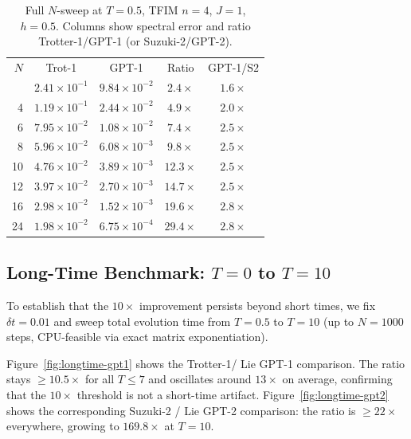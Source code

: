 \documentclass[aps,prxquantum,twocolumn,nofootinbib]{revtex4-2}
\begin{document}
\begin{table}[t]
  \caption{Full $N$-sweep at $T=0.5$, TFIM $n=4$, $J=1$, $h=0.5$.
    Columns show spectral error and ratio Trotter-1/GPT-1
    (or Suzuki-2/GPT-2).}
  \label{tab:nsweep}
  \begin{ruledtabular}
    \small
    \begin{tabular}{rcccc}
      $N$ & Trot-1 & GPT-1 & Ratio & GPT-1/$\text{S2}$ \\
      \colrule
      2  & $2.41\times10^{-1}$ & $9.84\times10^{-2}$ & $2.4\times$ & $1.6\times$ \\
      4  & $1.19\times10^{-1}$ & $2.44\times10^{-2}$ & $4.9\times$ & $2.0\times$ \\
      6  & $7.95\times10^{-2}$ & $1.08\times10^{-2}$ & $7.4\times$ & $2.5\times$ \\
      8  & $5.96\times10^{-2}$ & $6.08\times10^{-3}$ & $9.8\times$ & $2.5\times$ \\
      10 & $4.76\times10^{-2}$ & $3.89\times10^{-3}$ & $12.3\times$ & $2.5\times$\\
      12 & $3.97\times10^{-2}$ & $2.70\times10^{-3}$ & $14.7\times$ & $2.5\times$\\
      16 & $2.98\times10^{-2}$ & $1.52\times10^{-3}$ & $19.6\times$ & $2.8\times$\\
      24 & $1.98\times10^{-2}$ & $6.75\times10^{-4}$ & $29.4\times$ & $2.8\times$\\
    \end{tabular}
  \end{ruledtabular}
\end{table}

\subsection{Long-Time Benchmark: $T=0$ to $T=10$}
\label{sec:longtime}

To establish that the $10\times$ improvement persists beyond short
times, we fix $\delta t=0.01$ and sweep total evolution time from
$T=0.5$ to $T=10$ (up to $N=1000$ steps, CPU-feasible via exact
matrix exponentiation).

Figure~\ref{fig:longtime-gpt1} shows the Trotter-1/ Lie GPT-1
comparison.  The ratio stays $\geq\!10.5\times$ for all $T\leq7$ and
oscillates around $13\times$ on average, confirming that the
$10\times$ threshold is not a short-time artifact.
Figure~\ref{fig:longtime-gpt2} shows the corresponding Suzuki-2 /
Lie GPT-2 comparison: the ratio is $\geq\!22\times$ everywhere,
growing to $169.8\times$ at $T=10$.
\end{document}
